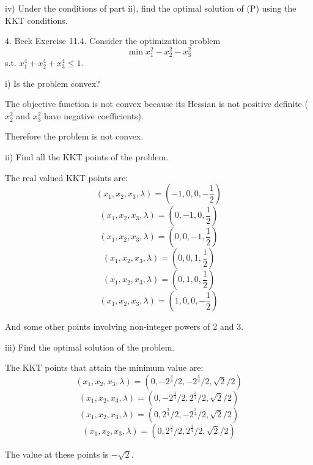 \documentclass{article}
\begin{document}
iv) Under the conditions of part ii), find the optimal solution of (P) using the KKT conditions.



4. Beck Exercise 11.4. Consider the optimization problem
\[\min x_1^2 - x_2^2 - x_3^2\]
s.t. $x_1^4 + x_2^4 + x_3^4 \leq 1$.

i) Is the problem convex?

The objective function is not convex because its Hessian is not positive definite
($x_2^2$ and $x_3^2$ have negative coefficients).

Therefore the problem is not convex.

ii) Find all the KKT points of the problem.

The real valued KKT points are:
\[(x_1, x_2, x_3, \lambda) = (-1, 0, 0, -\frac{1}{2})\]
\[(x_1, x_2, x_3, \lambda) = (0, -1, 0, \frac{1}{2})\]
\[(x_1, x_2, x_3, \lambda) = (0, 0, -1, \frac{1}{2})\]
\[(x_1, x_2, x_3, \lambda) = (0, 0, 1, \frac{1}{2})\]
\[(x_1, x_2, x_3, \lambda) = (0, 1, 0, \frac{1}{2})\]
\[(x_1, x_2, x_3, \lambda) = (1, 0, 0, -\frac{1}{2})\]

And some other points involving non-integer powers of 2 and 3.

iii) Find the optimal solution of the problem.

The KKT points that attain the minimum value are:
\[(x_1, x_2, x_3, \lambda) = (0, -2^{\frac{3}{4}}/2, -2^{\frac{3}{4}}/2, \sqrt{2}/2)\]
\[(x_1, x_2, x_3, \lambda) = (0, -2^{\frac{3}{4}}/2, 2^{\frac{3}{4}}/2, \sqrt{2}/2)\]
\[(x_1, x_2, x_3, \lambda) = (0, 2^{\frac{3}{4}}/2, -2^{\frac{3}{4}}/2, \sqrt{2}/2)\]
\[(x_1, x_2, x_3, \lambda) = (0, 2^{\frac{3}{4}}/2, 2^{\frac{3}{4}}/2, \sqrt{2}/2)\]

The value at these points is $-\sqrt{2}$.
\end{document}
